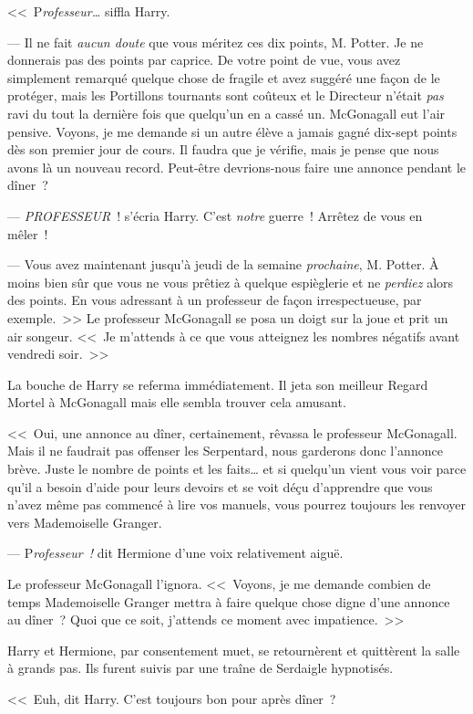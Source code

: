 <<~P\emph{rofesseur…} siffla Harry.

--- Il ne fait \emph{aucun doute} que vous méritez ces dix points, M. Potter. Je ne donnerais pas des points par caprice. De votre point de vue, vous avez simplement remarqué quelque chose de fragile et avez suggéré une façon de le protéger, mais les Portillons tournants sont coûteux et le Directeur n'était \emph{pas} ravi du tout la dernière fois que quelqu'un en a cassé un. McGonagall eut l'air pensive. Voyons, je me demande si un autre élève a jamais gagné dix-sept points dès son premier jour de cours. Il faudra que je vérifie, mais je pense que nous avons là un nouveau record. Peut-être devrions-nous faire une annonce pendant le dîner~?

--- \emph{PROFESSEUR}~! s'écria Harry. C'est \emph{notre} guerre~! Arrêtez de vous en mêler~!

--- Vous avez maintenant jusqu'à jeudi de la semaine \emph{prochaine}, M. Potter. À moins bien sûr que vous ne vous prêtiez à quelque espièglerie et ne \emph{perdiez} alors des points. En vous adressant à un professeur de façon irrespectueuse, par exemple.~>> Le professeur McGonagall se posa un doigt sur la joue et prit un air songeur. <<~Je m'attends à ce que vous atteignez les nombres négatifs avant vendredi soir.~>>

La bouche de Harry se referma immédiatement. Il jeta son meilleur Regard Mortel à McGonagall mais elle sembla trouver cela amusant.

<<~Oui, une annonce au dîner, certainement, rêvassa le professeur McGonagall. Mais il ne faudrait pas offenser les Serpentard, nous garderons donc l'annonce brève. Juste le nombre de points et les faits… et si quelqu'un vient vous voir parce qu'il a besoin d'aide pour leurs devoirs et se voit déçu d'apprendre que vous n'avez même pas commencé à lire vos manuels, vous pourrez toujours les renvoyer vers Mademoiselle Granger.

--- P\emph{rofesseur~!} dit Hermione d'une voix relativement aiguë.

Le professeur McGonagall l'ignora. <<~Voyons, je me demande combien de temps Mademoiselle Granger mettra à faire quelque chose digne d'une annonce au dîner~? Quoi que ce soit, j'attends ce moment avec impatience.~>>

Harry et Hermione, par consentement muet, se retournèrent et quittèrent la salle à grands pas. Ils furent suivis par une traîne de Serdaigle hypnotisés.

<<~Euh, dit Harry. C'est toujours bon pour après dîner~?

